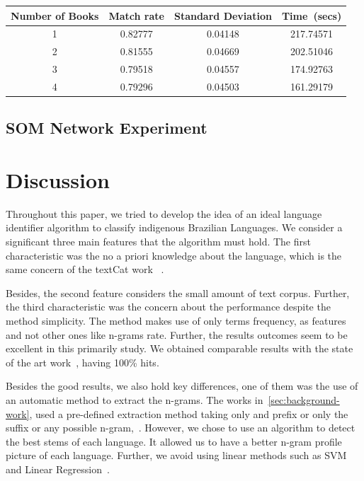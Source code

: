 \documentclass[runningheads]{llncs}
\begin{document}
    \begin{center}
        \begin{tabular}{ ||c c c c || }
            \hline
            Number of Books &  Match rate & Standard Deviation & Time~(secs)\\ [0.5ex]
            \hline\hline
            1 &  0.82777 & 0.04148 & 217.74571\\
            2 &  0.81555 & 0.04669 & 202.51046\\
            3 &  0.79518 & 0.04557 & 174.92763\\
            4 &  0.79296 &  0.04503 & 161.29179\\
            \hline
        \end{tabular}
    \end{center}

    \subsection{SOM Network Experiment}\label{subsec:som-experiment}
    \section{Discussion}\label{sec:discussion}

    Throughout this paper, we tried to develop the idea of an ideal language identifier algorithm to classify indigenous Brazilian Languages.
    We consider a significant three main features that the algorithm must hold. The first characteristic was the no a priori knowledge about the language, which is the same concern of the textCat work ~\cite{cavnar1994n}.

    Besides, the second feature considers the small amount of text corpus.
    Further, the third characteristic was the concern about the performance despite the method simplicity. The method makes use of only terms frequency, as features and not other ones like n-grams rate.
    Further, the results outcomes seem to be excellent in this primarily study.
    We obtained comparable results with the state of the art work~\cite{cavnar1994n}, having 100\% hits.

    Besides the good results, we also hold key differences, one of them was the use of an automatic method to extract the n-grams.
    The works in~\ref{sec:background-work}, used a pre-defined extraction method taking only and prefix or only the suffix or any possible n-gram\cite{cavnar1994n},~\cite{gomez2017discriminating}.
    However, we chose to use an algorithm to detect the best stems of each language.
    It allowed us to have a better n-gram profile picture of each language.
    Further, we avoid using linear methods such as SVM and Linear Regression~\cite{gomez2017discriminating}.
\end{document}
